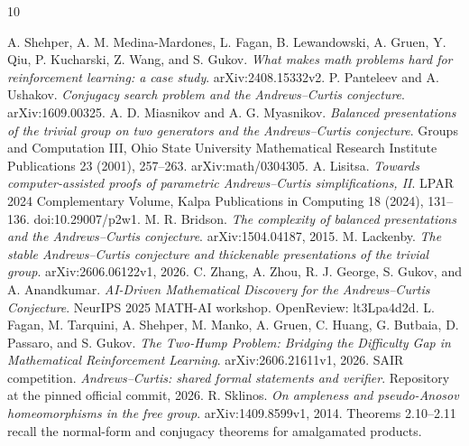 \documentclass[11pt]{article}
\theoremstyle{definition}\newtheorem{definition}[theorem]{Definition}
\theoremstyle{remark}\newtheorem{remark}[theorem]{Remark}
\begin{document}
\begin{thebibliography}{10}
\raggedright
{} A. Shehper, A. M. Medina-Mardones, L. Fagan, B. Lewandowski, A. Gruen, Y. Qiu, P. Kucharski, Z. Wang, and S. Gukov. \emph{What makes math problems hard for reinforcement learning: a case study}. arXiv:2408.15332v2.
 P. Panteleev and A. Ushakov. \emph{Conjugacy search problem and the Andrews--Curtis conjecture}. arXiv:1609.00325.
 A. D. Miasnikov and A. G. Myasnikov. \emph{Balanced presentations of the trivial group on two generators and the Andrews--Curtis conjecture}. Groups and Computation III, Ohio State University Mathematical Research Institute Publications 23 (2001), 257--263. arXiv:math/0304305.
 A. Lisitsa. \emph{Towards computer-assisted proofs of parametric Andrews--Curtis simplifications, II}. LPAR 2024 Complementary Volume, Kalpa Publications in Computing 18 (2024), 131--136. doi:10.29007/p2w1.
 M. R. Bridson. \emph{The complexity of balanced presentations and the Andrews--Curtis conjecture}. arXiv:1504.04187, 2015.
 M. Lackenby. \emph{The stable Andrews--Curtis conjecture and thickenable presentations of the trivial group}. arXiv:2606.06122v1, 2026.
 C. Zhang, A. Zhou, R. J. George, S. Gukov, and A. Anandkumar. \emph{AI-Driven Mathematical Discovery for the Andrews--Curtis Conjecture}. NeurIPS 2025 MATH-AI workshop. OpenReview: lt3Lpa4d2d.
 L. Fagan, M. Tarquini, A. Shehper, M. Manko, A. Gruen, C. Huang, G. Butbaia, D. Passaro, and S. Gukov. \emph{The Two-Hump Problem: Bridging the Difficulty Gap in Mathematical Reinforcement Learning}. arXiv:2606.21611v1, 2026.
 SAIR competition. \emph{Andrews--Curtis: shared formal statements and verifier}. Repository at the pinned official commit, 2026.
 R. Sklinos. \emph{On ampleness and pseudo-Anosov homeomorphisms in the free group}. arXiv:1409.8599v1, 2014. Theorems 2.10--2.11 recall the normal-form and conjugacy theorems for amalgamated products.
\end{thebibliography}
\end{document}
